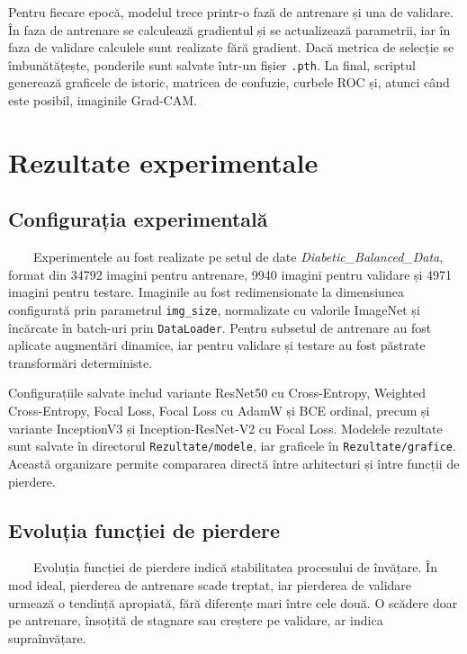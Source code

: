 \documentclass[12pt, a4paper, oneside, romanian]{teza-upb}
\begin{document}
Pentru fiecare epocă, modelul trece printr-o fază de antrenare și una de validare. În faza de antrenare se calculează gradientul și se actualizează parametrii, iar în faza de validare calculele sunt realizate fără gradient. Dacă metrica de selecție se îmbunătățește, ponderile sunt salvate într-un fișier \texttt{.pth}. La final, scriptul generează graficele de istoric, matricea de confuzie, curbele ROC și, atunci când este posibil, imaginile Grad-CAM.


\chapter{Rezultate experimentale}

\section{Configurația experimentală}

\ \ \ \ Experimentele au fost realizate pe setul de date \textit{Diabetic\_Balanced\_Data}, format din 34792 imagini pentru antrenare, 9940 imagini pentru validare și 4971 imagini pentru testare. Imaginile au fost redimensionate la dimensiunea configurată prin parametrul \texttt{img\_size}, normalizate cu valorile ImageNet și încărcate în batch-uri prin \texttt{DataLoader}. Pentru subsetul de antrenare au fost aplicate augmentări dinamice, iar pentru validare și testare au fost păstrate transformări deterministe.
\bigskip

Configurațiile salvate includ variante ResNet50 cu Cross-Entropy, Weighted Cross-Entropy, Focal Loss, Focal Loss cu AdamW și BCE ordinal, precum și variante InceptionV3 și Inception-ResNet-V2 cu Focal Loss. Modelele rezultate sunt salvate în directorul \texttt{Rezultate/modele}, iar graficele în \texttt{Rezultate/grafice}. Această organizare permite compararea directă între arhitecturi și între funcții de pierdere.

\section{Evoluția funcției de pierdere}

\ \ \ \ Evoluția funcției de pierdere indică stabilitatea procesului de învățare. În mod ideal, pierderea de antrenare scade treptat, iar pierderea de validare urmează o tendință apropiată, fără diferențe mari între cele două. O scădere doar pe antrenare, însoțită de stagnare sau creștere pe validare, ar indica supraînvățare.
\bigskip
\end{document}
